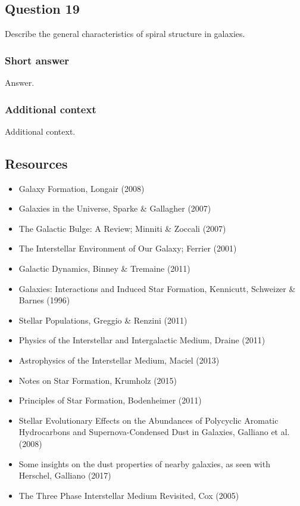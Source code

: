 \documentclass[a4paper,10pt]{article}
\begin{document}

\newpage
\subsection{Question 19}

Describe the general characteristics of spiral structure in galaxies.

\subsubsection{Short answer}

Answer.

\subsubsection{Additional context}

Additional context.


\newpage
\subsection{Resources}

\begin{itemize}
    \item Galaxy Formation, Longair (2008)
    \item Galaxies in the Universe, Sparke \& Gallagher (2007)
    \item The Galactic Bulge: A Review; Minniti \& Zoccali (2007)
    \item The Interstellar Environment of Our Galaxy; Ferrier (2001)
    \item Galactic Dynamics, Binney \& Tremaine (2011)
    \item Galaxies: Interactions and Induced Star Formation, Kennicutt, Schweizer \& Barnes (1996)
    \item Stellar Populations, Greggio \& Renzini (2011)
    \item Physics of the Interstellar and Intergalactic Medium, Draine (2011)
    \item Astrophysics of the Interstellar Medium, Maciel (2013)
    \item Notes on Star Formation, Krumholz (2015)
    \item Principles of Star Formation, Bodenheimer (2011)
    \item Stellar Evolutionary Effects on the Abundances of Polycyclic Aromatic Hydrocarbons and Supernova-Condensed Dust in Galaxies, Galliano et al. (2008)
    \item Some insights on the dust properties of nearby galaxies, as seen with Herschel, Galliano (2017)
    \item The Three Phase Interstellar Medium Revisited, Cox (2005)
\end{itemize}
\end{document}
